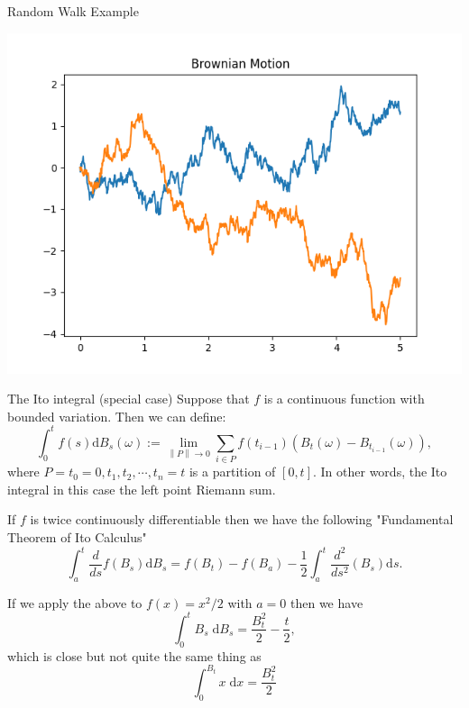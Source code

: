 \documentclass{beamer}%
\numberwithin{equation}{section}
\newcommand{\Norm}[1]{\left\|  #1   \right\|}
\newcommand{\ud}{\ensuremath{\mathrm{d} }}
\begin{document}
\begin{frame}{Random Walk Example}
	\begin{center}
		\includegraphics[scale=.7]{BrownianMotion.png}
	\end{center}
\end{frame}


\begin{frame}{The Ito integral (special case)}
	Suppose that $f$ is a continuous function with bounded variation. Then we can define:
		\[
			\int_0^t f(s) \ud B_s(\omega) := \lim_{\Norm{P} \to 0} \sum _{i \in P} f(t_{i-1}) (B_t(\omega) - B_{t_{i-1}}(\omega)),
		\]
	where $P = {t_0 = 0, t_1, t_2, \cdots, t_n = t}$ is a partition of $[0,t]$. In other words, the Ito integral in this case the left point Riemann sum. 
\end{frame}

\begin{frame}
		\begin{theorem}
		If $f$ is twice continuously differentiable then we have the following "Fundamental Theorem of Ito Calculus"
		\[
		\int_a^t \frac{d}{ds} f(B_s) \ud B_s = f(B_t) - f(B_a) - \frac{1}{2} \int_a^t \frac{d^2}{ds^2}(B_s) \ud s.
		\]
	\end{theorem}

\begin{example}
If we apply the above to $f(x) = x^2 / 2$ with $a=0$ then we have 
	\[
		\int_0^t B_s \; \ud B_s = \frac{B_t^2}{2}  - \frac{t}{2},
	\]
which is close but not quite the same thing as 
	\[
		\int_0^{B_t} x \; \ud x = \frac{B_t^2}{2} 
	\]
\end{example}
\end{frame}
\end{document}
